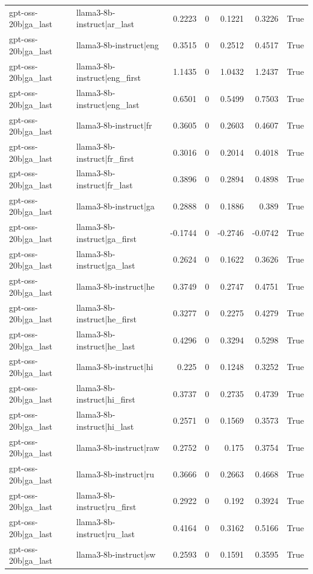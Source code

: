 \begin{table}
\begin{tabular}{l l r r r r l}
gpt-oss-20b|ga_last & llama3-8b-instruct|ar_last & 0.2223 & 0 & 0.1221 & 0.3226 & True \\
gpt-oss-20b|ga_last & llama3-8b-instruct|eng & 0.3515 & 0 & 0.2512 & 0.4517 & True \\
gpt-oss-20b|ga_last & llama3-8b-instruct|eng_first & 1.1435 & 0 & 1.0432 & 1.2437 & True \\
gpt-oss-20b|ga_last & llama3-8b-instruct|eng_last & 0.6501 & 0 & 0.5499 & 0.7503 & True \\
gpt-oss-20b|ga_last & llama3-8b-instruct|fr & 0.3605 & 0 & 0.2603 & 0.4607 & True \\
gpt-oss-20b|ga_last & llama3-8b-instruct|fr_first & 0.3016 & 0 & 0.2014 & 0.4018 & True \\
gpt-oss-20b|ga_last & llama3-8b-instruct|fr_last & 0.3896 & 0 & 0.2894 & 0.4898 & True \\
gpt-oss-20b|ga_last & llama3-8b-instruct|ga & 0.2888 & 0 & 0.1886 & 0.389 & True \\
gpt-oss-20b|ga_last & llama3-8b-instruct|ga_first & -0.1744 & 0 & -0.2746 & -0.0742 & True \\
gpt-oss-20b|ga_last & llama3-8b-instruct|ga_last & 0.2624 & 0 & 0.1622 & 0.3626 & True \\
gpt-oss-20b|ga_last & llama3-8b-instruct|he & 0.3749 & 0 & 0.2747 & 0.4751 & True \\
gpt-oss-20b|ga_last & llama3-8b-instruct|he_first & 0.3277 & 0 & 0.2275 & 0.4279 & True \\
gpt-oss-20b|ga_last & llama3-8b-instruct|he_last & 0.4296 & 0 & 0.3294 & 0.5298 & True \\
gpt-oss-20b|ga_last & llama3-8b-instruct|hi & 0.225 & 0 & 0.1248 & 0.3252 & True \\
gpt-oss-20b|ga_last & llama3-8b-instruct|hi_first & 0.3737 & 0 & 0.2735 & 0.4739 & True \\
gpt-oss-20b|ga_last & llama3-8b-instruct|hi_last & 0.2571 & 0 & 0.1569 & 0.3573 & True \\
gpt-oss-20b|ga_last & llama3-8b-instruct|raw & 0.2752 & 0 & 0.175 & 0.3754 & True \\
gpt-oss-20b|ga_last & llama3-8b-instruct|ru & 0.3666 & 0 & 0.2663 & 0.4668 & True \\
gpt-oss-20b|ga_last & llama3-8b-instruct|ru_first & 0.2922 & 0 & 0.192 & 0.3924 & True \\
gpt-oss-20b|ga_last & llama3-8b-instruct|ru_last & 0.4164 & 0 & 0.3162 & 0.5166 & True \\
gpt-oss-20b|ga_last & llama3-8b-instruct|sw & 0.2593 & 0 & 0.1591 & 0.3595 & True \\

\end{tabular}
\end{table}
